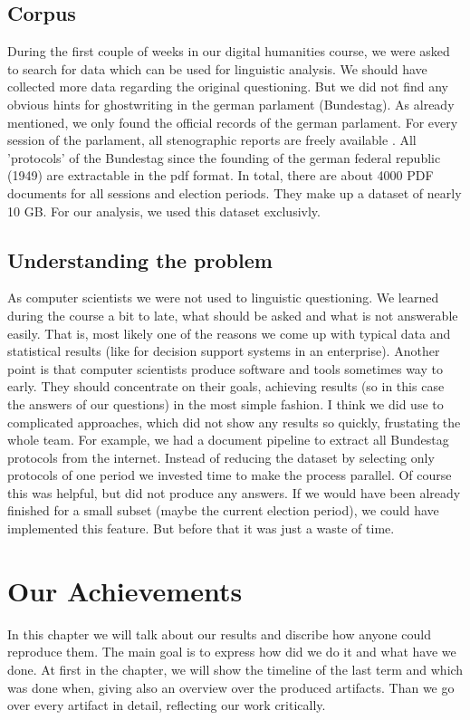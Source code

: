 \documentclass[12pt,paper=a4,nenglish]{scrreprt}
\begin{document}
\section{Corpus}
During the first couple of weeks in our digital humanities course, we were
asked to search for data which can be used for linguistic analysis.
We should have collected more data regarding the original questioning. But we
did not find any obvious hints for ghostwriting in the german
parlament (Bundestag). 
As already mentioned, we only found the official records of the german
parlament.
For every session of the parlament, all stenographic reports are freely
available \cite{link_plenarprotokolle}. All 'protocols' of the Bundestag since the founding of the german federal republic
(1949) are extractable in the pdf format. In total, there are about 4000 PDF
documents for all sessions and election periods. 
They make up a dataset of nearly 10 GB. 
For our analysis, we used this dataset exclusivly. 
\section{Understanding the problem}
\label{sec:understanding_the_problem}
As computer scientists we were not used to linguistic questioning. We learned
during the course a bit to late, what should be asked and what is not answerable
easily. That is, most likely one of the reasons we come up with typical data and
statistical results (like for decision support systems in an enterprise). 
Another point is that computer scientists produce software and tools sometimes
way to early. They should concentrate on their goals, achieving results (so in
this case the answers of our questions) in the most simple fashion. I think we
did use to complicated approaches, which did not show any results so quickly,
frustating the whole team. For example, we had a document pipeline to extract
all Bundestag protocols from the internet. Instead of reducing the dataset by
selecting only protocols of one period we invested time to make the process
parallel. Of course this was  helpful, but did not produce any answers. If we
would have been already finished for a small subset (maybe the current
election period), we could have implemented this feature. But
before that it was just a waste of time.

\chapter{Our Achievements}
In this chapter we will talk about our results
and discribe how anyone could reproduce them. The main goal is to express how
did we do it and what have we done. At first in the chapter, we will show the
timeline of the last term and which was done when, giving also an overview over
the produced artifacts. Than we go over every artifact in detail, reflecting
our work critically. 
\end{document}
